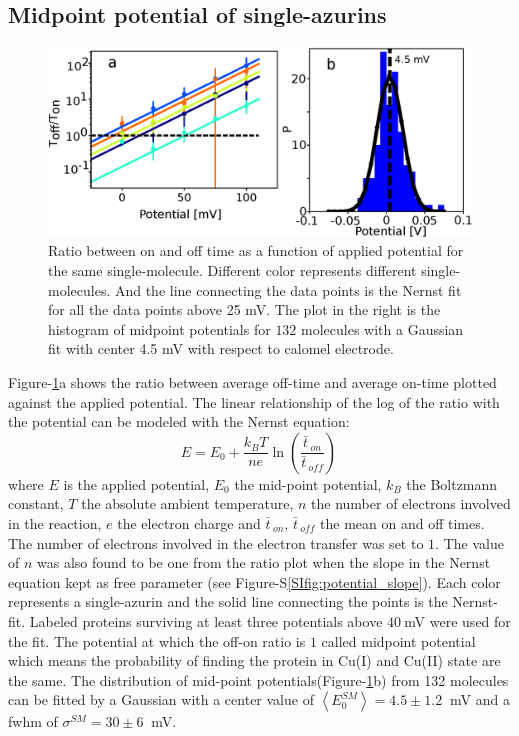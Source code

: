 \documentclass[journal=jacsat,manuscript=article]{achemso}
\newcommand*\me[1]{\ensuremath{\bar{#1}\,}}
\begin{document}
\subsection{Midpoint potential of single-azurins}
\begin{figure}
	\includegraphics[width=\textwidth]{Figure_2_midpoint.eps}
	\caption{Ratio between on and off time as a function of applied potential for the same single-molecule. Different color represents different single-molecules. And the line connecting the data points is the Nernst fit for all the data points above 25 mV. The plot in the right is the histogram of midpoint potentials for $132$ molecules with a Gaussian fit with center 4.5 mV with respect to calomel electrode.}
	\label{fig:midpoint}
\end{figure}
Figure-\ref{fig:midpoint}a shows the ratio between average off-time and average on-time plotted against the applied potential. The linear relationship of the log of the ratio with the potential can be modeled with the Nernst equation: 
\begin{equation}
	E = E_0 + \frac{k_BT}{n e}\ln\left(\frac{\me{t}_{on}}{\me{t}_{off}}\right)\,
	\label{eq:nernst}
\end{equation}
where $E$ is the applied potential, $E_0$ the mid-point potential, $k_B$ the Boltzmann constant, $T$ the absolute ambient temperature, $n$ the number of electrons involved in the reaction, $e$ the electron charge and $\me{t}_{on}$, $\me{t}_{off}$ the mean on and off times. The number of electrons involved in the electron transfer was set to $1$. The value of $n$ was also found to be one from the ratio plot when the slope in the Nernst equation kept as free parameter (see Figure-S\ref{SIfig:potential_slope}). Each color represents a single-azurin and the solid line connecting the points is the Nernst-fit. Labeled proteins surviving at least three potentials above $40~$mV were used for the fit. The potential at which the off-on ratio is $1$ called midpoint potential which means the probability of finding the protein in Cu(I) and Cu(II) state are the same. The distribution of mid-point potentials(Figure-\ref{fig:midpoint}b) from 132 molecules can be fitted by a Gaussian with a center value of $\left<E_0^{SM}\right>=4.5 \pm 1.2~$ mV and a fwhm of $\sigma^{SM}=30 \pm 6~$ mV.\\
\end{document}
